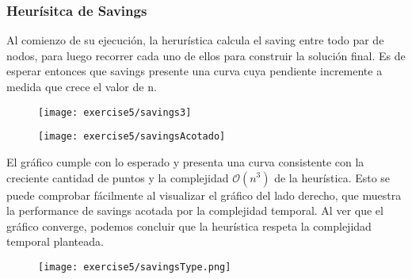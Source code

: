\subsubsection{Heurísitca de Savings}


Al comienzo de su ejecución, la herurística calcula el saving entre todo par de nodos, para luego recorrer cada uno de ellos para construir la solución final. Es de esperar entonces que savings presente una curva cuya pendiente incremente a medida que crece el valor de n.

\begin{figure}[H]
	\centering
	\begin{minipage}[t]{.45\textwidth}
		\centering
		\texttt{[image: exercise5/savings3]}
	\end{minipage}\qquad
	\begin{minipage}[t]{.45\textwidth}
		\centering
		\texttt{[image: exercise5/savingsAcotado]}
	\end{minipage}
\end{figure}

El gráfico cumple con lo esperado y presenta una curva consistente con la creciente cantidad de puntos y la complejidad $\mathcal{O}(n^{3})$ de la heurística. Esto se puede comprobar fácilmente al visualizar el gráfico del lado derecho, que muestra la performance de savings acotada por la complejidad temporal. Al ver que el gráfico converge, podemos concluir que la heurística respeta la complejidad temporal planteada.



\begin{figure}[H]
	\centering
	\texttt{[image: exercise5/savingsType.png]}
\end{figure}